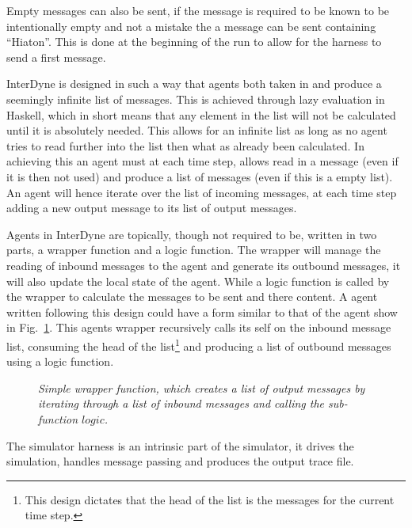 \documentclass{article}
\begin{document}
Empty messages can also be sent, if the message is required to be known to be intentionally empty and not a mistake the a message can be sent containing ``Hiaton''. This is done at the beginning of the run to allow for the harness to send a first message. 

InterDyne is designed in such a way that agents both taken in and produce a seemingly infinite list of messages. This is achieved through lazy evaluation in Haskell, which in short means that any element in the list will not be calculated until it is absolutely needed. This allows for an infinite list as long as no agent tries to read further into the list then what as already been calculated. In achieving this an agent must at each time step, allows read in a message (even if it is then not used) and produce a list of messages (even if this is a empty list). An agent will hence iterate over the list of incoming messages, at each time step adding a new output message to its list of output messages.  

Agents in InterDyne are topically, though not required to be, written in two parts, a wrapper function and a logic function. The wrapper will manage the reading of inbound messages to the agent and generate its outbound messages, it will also update the local state of the agent. While a logic function is called by the wrapper to calculate the messages to be sent and there content. A agent written following this design could have a form similar to that of the agent show in Fig.~\ref{fig:wrapperfrominterdyne}. This agents wrapper recursively calls its self on the inbound message list, consuming the head of the list\footnote{This design dictates that the head of the list is the messages for the current time step.} and producing a list of outbound messages using a logic function.  
\begin{figure}[H]
	\centering
        
	\caption{\it Simple wrapper function, which creates a list of output messages by iterating through a list of inbound messages and calling the sub-function $logic$.}
	\label{fig:wrapperfrominterdyne}
\end{figure} 

The simulator harness is an intrinsic part of the simulator, it drives the simulation, handles message passing and produces the output trace file. %
\end{document}
